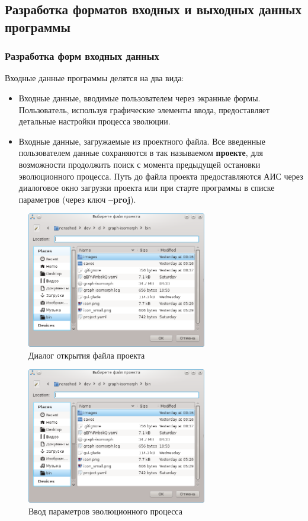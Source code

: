 \documentclass[russian,utf8,emptystyle]{eskdtext}
\begin{document}
\begin{spacing}{1.5}
\subsection{Разработка форматов входных и выходных данных программы}
\subsubsection{Разработка форм входных данных}

Входные данные программы делятся на два вида:
\begin{itemize}
\item Входные данные, вводимые пользователем через экранные формы. Пользователь, используя графические элементы ввода, предоставляет детальные настройки процесса эволюции.
\item Входные данные, загружаемые из проектного файла. Все введенные пользователем данные сохраняются в так называемом \textbf{проекте}, для возможности продолжить поиск с момента предыдущей остановки эволюционного процесса. Путь до файла проекта предоставляются АИС через диалоговое окно загрузки проекта или при старте программы в списке параметров (через ключ \textbf{--proj}).
\end{itemize}

\begin{figure}[h!]
\centering
\includegraphics[width=0.7\textwidth]{screen05}
\caption{Диалог открытия файла проекта}
\end{figure}

\begin{figure}[h!]
\centering
\includegraphics[width=0.7\textwidth]{screen05}
\caption{Ввод параметров эволюционного процесса}
\end{figure}


\end{spacing}
\end{document}
